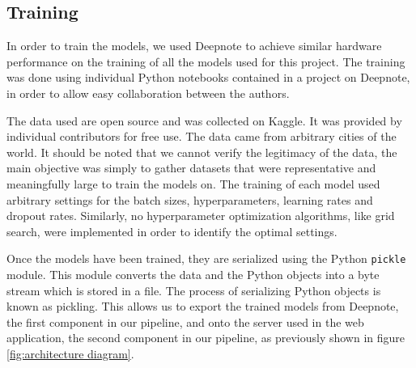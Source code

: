 \subsection{Training}\label{sec:training}
In order to train the models, we used Deepnote\cite{deepnote} to achieve similar hardware performance on the training of all the models used for this project. 
The training was done using individual Python notebooks contained in a project on Deepnote, in order to allow easy collaboration between the authors.

The data used are open source and was collected on Kaggle\cite{kaggle}. It was provided by individual contributors for free use.
The data came from arbitrary cities of the world. 
It should be noted that we cannot verify the legitimacy of the data, the main objective was simply to gather datasets that were representative and meaningfully large to train the models on. 
The training of each model used arbitrary settings for the batch sizes, hyperparameters, learning rates and dropout rates. Similarly, no hyperparameter optimization algorithms, like grid search, were implemented in order to identify the optimal settings. 

Once the models have been trained, they are serialized using the Python \texttt{pickle} module.
This module converts the data and the Python objects into a byte stream which is stored in a file.
The process of serializing Python objects is known as pickling. 
This allows us to export the trained models from Deepnote, the first component in our pipeline, and onto the server used in the web application, the second component in our pipeline, as previously shown in figure \ref{fig:architecture diagram}.\cite{pickle_documentation}